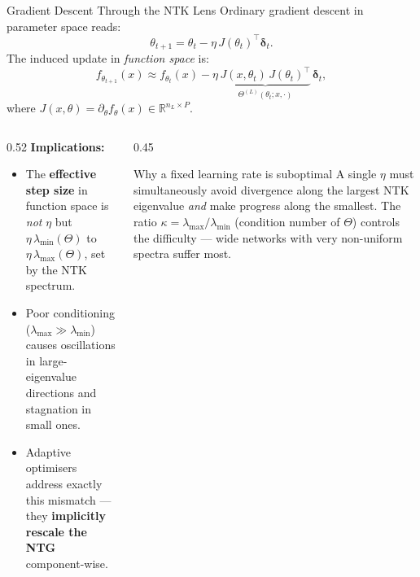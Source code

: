 \documentclass[aspectratio=169, 10pt]{beamer}
\newcommand{\R}{\mathbb{R}}
\newcommand{\highlight}[1]{\textcolor{blue!70!black}{\textbf{#1}}}
\begin{document}
\begin{frame}{Gradient Descent Through the NTK Lens}
  Ordinary gradient descent in parameter space reads:
  \[
    \theta_{t+1} = \theta_t - \eta\, J(\theta_t)^\top \bm\delta_t.
  \]
  The induced update in \emph{function space} is:
  \[
    f_{\theta_{t+1}}(x) \approx f_{\theta_t}(x) - \eta\,
    \underbrace{J(x,\theta_t)\,J(\theta_t)^\top}_{\Theta^{(L)}(\theta_t;x,\cdot)}\,\bm\delta_t,
  \]
  where $J(x,\theta) = \partial_\theta f_\theta(x)\in\R^{n_L\times P}$.

  \vspace{0.4em}
  \begin{columns}[T]
    \begin{column}{0.52\textwidth}
      \textbf{Implications:}
      \begin{itemize}
        \item The \highlight{effective step size} in function space is \emph{not} $\eta$ but $\eta\,\lambda_{\min}(\Theta)$
              to $\eta\,\lambda_{\max}(\Theta)$, set by the NTK spectrum.
        \item Poor conditioning ($\lambda_{\max}\!\gg\!\lambda_{\min}$) causes
              oscillations in large-eigenvalue directions and stagnation in small ones.
        \item Adaptive optimisers address exactly this mismatch — they
              \highlight{implicitly rescale the NTG} component-wise.
      \end{itemize}
    \end{column}
    \begin{column}{0.45\textwidth}
      \begin{alertblock}{Why a fixed learning rate is suboptimal}
        A single $\eta$ must simultaneously avoid divergence along the
        largest NTK eigenvalue \emph{and} make progress along the smallest.
        The ratio $\kappa = \lambda_{\max}/\lambda_{\min}$ (condition number of $\Theta$)
        controls the difficulty — wide networks with very non-uniform spectra suffer most.
      \end{alertblock}
    \end{column}
  \end{columns}
\end{frame}
\end{document}
